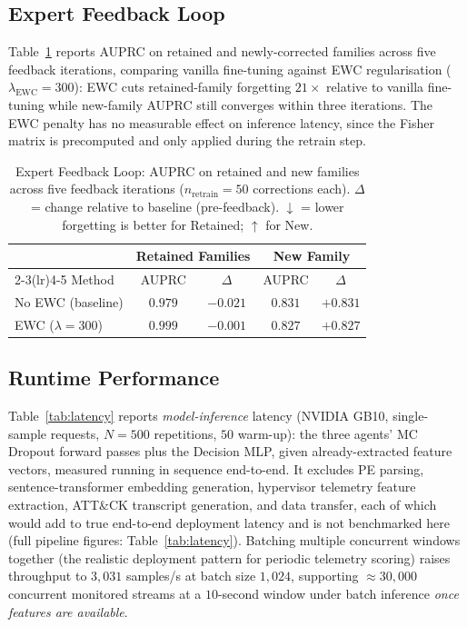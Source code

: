 \documentclass[journal]{IEEEtran}
\begin{document}
\subsection{Expert Feedback Loop}\label{sec:results_ewc}

Table~\ref{tab:ewc_feedback} reports AUPRC on retained and newly-corrected
families across five feedback iterations, comparing vanilla fine-tuning
against EWC regularisation ($\lambda_{\text{EWC}}{=}300$): EWC cuts
retained-family forgetting $21\times$ relative to vanilla fine-tuning
while new-family AUPRC still converges within three iterations. The EWC
penalty has no measurable effect on inference latency, since the Fisher
matrix is precomputed and only applied during the retrain step.

\begin{table}[t]
\centering
\footnotesize
\caption{Expert Feedback Loop: AUPRC on retained and new families across
  five feedback iterations ($n_{\text{retrain}}{=}50$ corrections each).
  $\Delta$ = change relative to baseline (pre-feedback).
  $\downarrow$ = lower forgetting is better for Retained; $\uparrow$ for New.
}
\label{tab:ewc_feedback}
\setlength{\tabcolsep}{4pt}
\begin{tabular}{lcccc}
\toprule
 & \multicolumn{2}{c}{Retained Families} & \multicolumn{2}{c}{New Family} \\
\cmidrule(lr){2-3}\cmidrule(lr){4-5}
Method & AUPRC & $\Delta$ & AUPRC & $\Delta$ \\
\midrule
No EWC (baseline) & $0.979$ & $-0.021$ & $0.831$ & $+0.831$ \\
EWC ($\lambda{=}300$) & $\mathbf{0.999}$ & $\mathbf{-0.001}$ & $0.827$ & $+0.827$ \\
\bottomrule
\end{tabular}
\end{table}

\subsection{Runtime Performance}\label{sec:runtime}

Table~\ref{tab:latency} reports \emph{model-inference} latency (NVIDIA
GB10, single-sample requests, $N{=}500$ repetitions, $50$ warm-up): the
three agents' MC Dropout forward passes plus the Decision MLP, given
already-extracted feature vectors, measured running in sequence
end-to-end. It excludes PE parsing, sentence-transformer embedding
generation, hypervisor telemetry feature extraction, ATT\&CK transcript
generation, and data transfer, each of which would add to true end-to-end
deployment latency and is not benchmarked here (full pipeline figures:
Table~\ref{tab:latency}).
Batching multiple concurrent windows together (the realistic deployment
pattern for periodic telemetry scoring) raises throughput to $3{,}031$
samples/s at batch size $1{,}024$, supporting $\approx 30{,}000$
concurrent monitored streams at a $10$-second window under batch
inference \emph{once features are available}.
\end{document}
